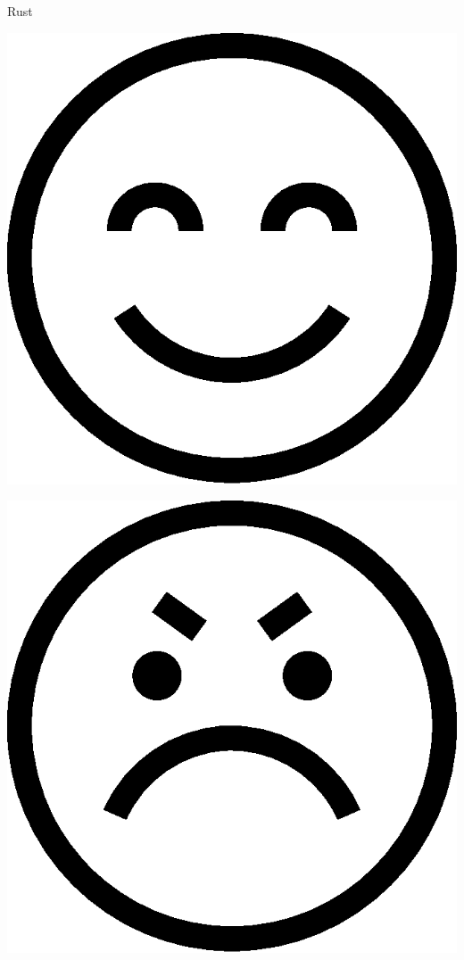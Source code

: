 \documentclass{beamer}
\renewcommand\big[1]{
  \begin{center}
    \Huge{#1}
  \end{center}
}
\def\BigSmiley{.25}
\begin{document}
\begin{frame}
  \big{Rust}
  \vskip 1cm
  \centering
  \begin{minipage}{.3\textwidth}
    \centering\includegraphics[scale=\BigSmiley]{good.eps}
  \end{minipage}
  \begin{minipage}{.3\textwidth}
    \centering\includegraphics[scale=\BigSmiley]{bad.eps}

\end{minipage}
\end{frame}
\end{document}
